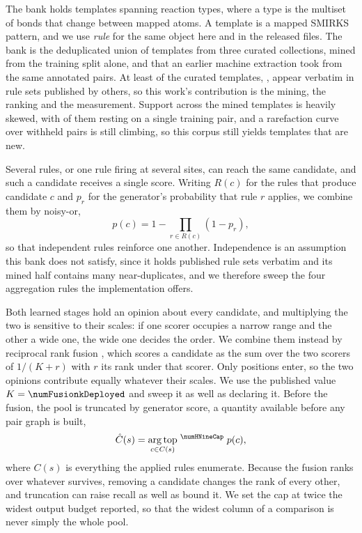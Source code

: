 The bank holds \numBankRules{} templates spanning \numBankTypes{} reaction types, where a type is
the multiset of bonds that change between mapped atoms. A template is a mapped SMIRKS pattern, and
we use \emph{rule} for the same object here and in the released files. The bank is the deduplicated
union of \numAttribNamed{} templates from three curated collections, \numMinedRules{} mined from
the training split alone, and \numAttribUnattributed{} that an earlier machine extraction took from
the same annotated pairs. At least \numThirdpartyBorrowed{} of the \numAttribNamed{} curated
templates, \numThirdpartyBorrowedsharePct{}, appear verbatim in rule sets published by others,
so this work's contribution is the mining, the ranking and the measurement. Support across the mined templates is heavily
skewed, with \numRareSingletonsharePct{} of them resting on a single training pair, and a
rarefaction curve over withheld pairs is still climbing, so this corpus still yields
templates that are new.

Several rules, or one rule firing at several sites, can reach the same candidate, and such a
candidate receives a single score. Writing $R(c)$ for the rules that produce candidate $c$ and
$p_r$ for the generator's probability that rule $r$ applies, we combine them by noisy-or,
\begin{equation}
p(c) = 1 - \prod_{r \in R(c)} \left( 1 - p_r \right),
\label{eq:noisyor}
\end{equation}
so that independent rules reinforce one another. Independence is an
assumption this bank does not satisfy, since it holds published rule sets verbatim and its mined
half contains many near-duplicates, and we therefore sweep the four aggregation rules the
implementation offers.

Both learned stages hold an opinion about every candidate, and multiplying the two is sensitive to
their scales: if one scorer occupies a narrow range and the other a wide one, the wide one decides
the order. We combine them instead by reciprocal rank fusion \citep{cormack2009}, which scores a
candidate as the sum over the two scorers of $1/(K + r)$ with $r$ its rank under that scorer. Only
positions enter, so the two opinions contribute equally whatever their scales. We use the published
value $K = \numFusionkDeployed$ and sweep it as well as declaring it. Before the fusion, the pool
is truncated by generator score, a quantity available before any pair graph is built,
\begin{equation}
\hat{C}(s) = \operatorname*{arg\,top}_{c \in C(s)}{}^{\,\numHNineCap} \; p(c),
\end{equation}
where $C(s)$ is everything the applied rules enumerate. Because the fusion ranks over whatever
survives, removing a candidate changes the rank of every other, and truncation can raise recall as
well as bound it. We set the cap at twice the widest output budget reported, so that the widest
column of a comparison is never simply the whole pool.

